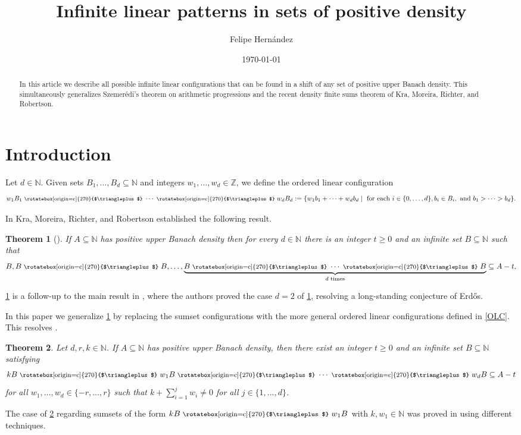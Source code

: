 \documentclass[letter,11pt]{article}
\newtheorem{theo}{Theorem}[section]
\theoremstyle{definition}
\newcommand{\N}{\mathbb{N}}
\newcommand{\Z}{\mathbb{Z}}
\newcommand{\gec}{\text{\footnotesize~\rotatebox[origin=c]{270}{$\triangleplus$}~}}
\begin{document}
\title{Infinite linear patterns in sets of positive density}
\author{Felipe Hernández}
\date{\small \today}
{\bf \Large \maketitle}
\begin{abstract}
In this article we describe all possible infinite linear configurations that can be found in a shift of any set of positive upper Banach density. This simultaneously generalizes Szemerédi's theorem on arithmetic progressions and the recent density finite sums theorem of Kra, Moreira, Richter, and Robertson.
\end{abstract}

\section{Introduction}
Let $d\in \N$. Given sets $B_1,\ldots,B_d\subseteq \N$ and integers $w_1,\ldots,w_d\in \Z$, we define the ordered linear configuration
\begin{equation}\label{OLC}
    w_1B_1\gec \cdots \gec w_dB_d:= \{ w_1b_1+ \cdots +w_db_d \mid \text{ for each } i\in \{0,\ldots,d\},b_i\in B_i, \text{ and } b_1>\cdots>b_d\}.
\end{equation}

In \cite{kmrr25} Kra, Moreira, Richter, and Robertson established the following result.
\begin{theo}[{\cite[2025]{kmrr25}}]\label{conj-KMRR25}
If $A\subseteq \N$ has positive upper Banach density then for every $d\in \N$ there is an integer $t\geq 0$ and an infinite set $B \subseteq \N$ such that 
$$B ,B\gec B,\ldots, \underbrace{B\gec \cdots \gec B}_{d\text{ times}} \subseteq A-t. $$
\end{theo}
\cref{conj-KMRR25} is a follow-up to the main result in \cite{Kra_Moreira_Richter_Robertson:2023}, where the authors proved the case $d=2$ of \cref{conj-KMRR25}, resolving a long-standing conjecture of Erd{\H o}s.


In this paper we generalize \cref{conj-KMRR25} by replacing the sumset configurations with the more general ordered linear configurations defined in \cref{OLC}. This resolves \cite[Question 3.11]{kmrr2023problemsinfinitesumsetconfigurations}. 
\begin{theo}\label{Conjecture-1}
Let $d,r,k\in \N$. If $A\subseteq \N$ has positive upper Banach density, then there exist an integer $t\geq0$ and an infinite set $B\subseteq \N$ satisfying
$$kB\gec w_1B \gec \cdots \gec w_dB\subseteq A-t  $$
for all $w_1,\ldots,w_d \in \{-r,\ldots,r\}$ such that $k+\sum_{i=1}^j w_i\neq 0$ for all $j\in \{1,\ldots,d\}$.
\end{theo}
The case of \cref{Conjecture-1} regarding sumsets of the form $k B \gec w_1 B$ with $k,w_1\in \N$ was proved in \cite{kousek2025} using different techniques.  
\end{document}
